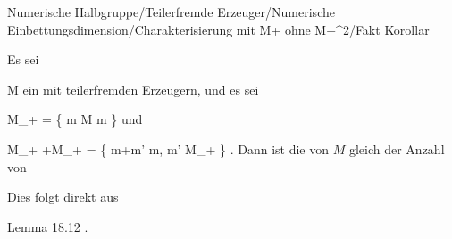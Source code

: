 {Numerische Halbgruppe/Teilerfremde Erzeuger/Numerische Einbettungsdimension/Charakterisierung mit M+ ohne M+^2/Fakt}
{Korollar}
{}
{



Es sei

\mavergleichskette
{\vergleichskette
{ M
}
{ \subseteq }{ \N
}
{  }{
}
{    }{
}
{   }{
}
}
{}{}{}
ein
mit teilerfremden Erzeugern, und es sei

\mavergleichskette
{\vergleichskette
{ M_+
}
{ = }{ \left\{  m \in M   \mid   m         \right\}
}
{  }{
}
{    }{
}
{   }{
}
}
{}{}{}
und

\mavergleichskette
{\vergleichskette
{ M_+ +M_+
}
{ = }{ \left\{  m+m'   \mid   m, m' \in M_+        \right\}
}
{  }{
}
{    }{
}
{   }{
}
}
{}{}{.}
Dann ist die
von $M$ gleich der Anzahl von





}
{





Dies folgt direkt aus

Lemma 18.12
.




}
